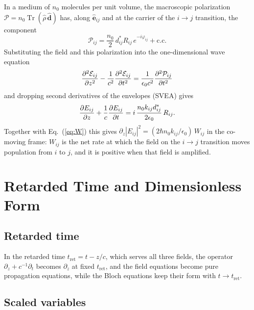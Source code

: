 \documentclass[12pt,a4paper]{article}
\newcommand{\E}{\mathcal{E}}
\newcommand{\tret}{t_{\mathrm{ret}}}
\begin{document}
In a medium of $n_0$ molecules per unit volume, the macroscopic polarization
$\bm{\mathcal{P}} = n_0\operatorname{Tr}(\hat{\rho}\,\hat{\bm{d}})$ has, along
$\hat{\bm{e}}_{ij}$ and at the carrier of the $i\rightarrow j$ transition, the
component
\begin{equation}
  \mathcal{P}_{ij} = \frac{n_0}{2}\,d_{ij}^*R_{ij}\,e^{-i\varphi_{ij}} + \mathrm{c.c.}
\end{equation}
Substituting the field and this polarization into the one-dimensional wave
equation
\begin{equation}
  \pderiv{^2\E_{ij}}{z^2} - \frac{1}{c^2}\pderiv{^2\E_{ij}}{t^2}
  = \frac{1}{\epsilon_0 c^2}\pderiv{^2\mathcal{P}_{ij}}{t^2}
\end{equation}
and dropping second derivatives of the envelopes (SVEA) gives
\begin{equation}
  \dfrac{\partial E_{ij}}{\partial z} + \frac{1}{c}\dfrac{\partial E_{ij}}{\partial t}
  = i\,\frac{n_0 k_{ij} d_{ij}^*}{2\epsilon_0}\,R_{ij}.
  \label{eq:max}
\end{equation}
Together with Eq.~(\ref{eq:W}) this gives
$\partial_z|E_{ij}|^2 = (2\hbar n_0 k_{ij}/\epsilon_0)\,W_{ij}$ in the
co-moving frame: $W_{ij}$ is the net rate at which the field on the
$i\rightarrow j$ transition moves population from $i$ to $j$, and it is
positive when that field is amplified.

\section{Retarded Time and Dimensionless Form}
\label{sec:dimless}

\subsection{Retarded time}

In the retarded time $\tret = t - z/c$, which serves all three fields, the
operator $\partial_z + c^{-1}\partial_t$ becomes $\partial_z$ at fixed
$\tret$, and the field equations become pure propagation equations, while
the Bloch equations keep their form with $t \rightarrow \tret$.

\subsection{Scaled variables}
\end{document}
